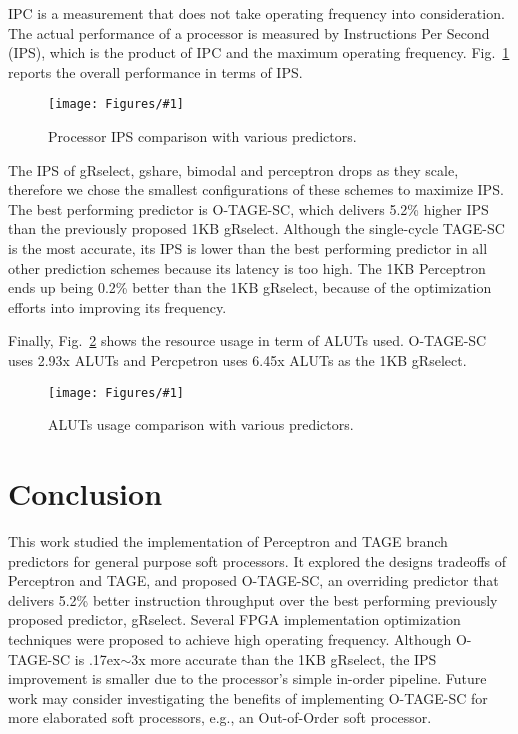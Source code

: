 \documentclass[conference]{IEEEtran}
\newcommand{\mytilde}{{\raise.17ex\hbox{$\scriptstyle\sim$}}}
\newcommand{\kfig}[4]{ %
        \begin{figure}[!t]
        \centering
        \texttt{[image: Figures/\#1]}
        \vspace{-1mm}
        \caption{#3}
        \label{#2}
        \end{figure}
}
\begin{document}
IPC is a measurement that does not take operating frequency into consideration. The actual performance of a processor is measured by Instructions Per Second (IPS), which is the product of IPC and the maximum operating frequency. Fig.~\ref{fig:adips} reports the overall performance in terms of IPS.
\kfig{adips.pdf}{fig:adips}{Processor IPS comparison with various predictors.}{angle = 0, trim = 0.9in 2.7in 0.7in 2.6in, clip, width=0.5\textwidth}

The IPS of gRselect, gshare, bimodal and perceptron drops as they scale, therefore we chose the smallest configurations of these schemes to maximize IPS. The best performing predictor is \mbox{O-TAGE-SC}, which delivers 5.2\% higher IPS than the previously proposed 1KB gRselect. Although the single-cycle \mbox{TAGE-SC} is the most accurate, its IPS is lower than the best performing predictor in all other prediction schemes  because its latency is too high. The 1KB Perceptron ends up being 0.2\% better than the 1KB gRselect, because of the optimization efforts into improving its frequency. 

Finally, Fig.~\ref{fig:adarea} shows the resource usage in term of ALUTs used. \mbox{O-TAGE-SC} uses 2.93x ALUTs and Percpetron uses 6.45x ALUTs as the 1KB gRselect.
\kfig{adarea.pdf}{fig:adarea}{ALUTs usage comparison with various predictors.}{angle = 0, trim = 0.9in 2.7in 0.7in 2.7in, clip, width=0.4\textwidth}

\section{Conclusion}
This work studied the implementation of  Perceptron and TAGE branch predictors for general purpose soft processors. It explored the designs tradeoffs of Perceptron and TAGE, and proposed \mbox{O-TAGE-SC}, an overriding predictor that delivers 5.2\% better instruction throughput over the best performing previously proposed predictor, gRselect. Several FPGA implementation optimization techniques were proposed to achieve high operating frequency. Although \mbox{O-TAGE-SC} is \mytilde 3x more accurate than the 1KB gRselect, the IPS improvement is  smaller due to the processor's simple in-order pipeline. Future work may consider investigating the benefits of implementing \mbox{O-TAGE-SC} for more elaborated soft processors, e.g., an Out-of-Order soft processor. 









\end{document}
